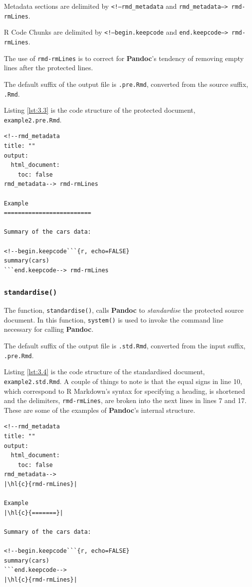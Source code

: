 \documentclass[a4paper, 12pt]{report}
\begin{document}
Metadata sections are delimited by \texttt{<!--rmd\_metadata} and \texttt{rmd\_metadata--> rmd-rmLines}.

R Code Chunks are delimited by \texttt{<!--begin.keepcode} and \texttt{end.keepcode--> rmd-rmLines}.

The use of \texttt{rmd-rmLines} is to correct for \textbf{Pandoc}'s tendency of removing empty lines after the protected lines.

The default suffix of the output file is \texttt{.pre.Rmd}, converted from the source suffix, \texttt{.Rmd}.

Listing \ref{lst:3.3} is the code structure of the protected document, \texttt{example2.pre.Rmd}.
\begin{lstlisting}[caption={\texttt{example2.pre.Rmd}}, label={lst:3.3}]
<!--rmd_metadata
title: ""
output:
  html_document:
    toc: false
rmd_metadata--> rmd-rmLines

Example
=========================

Summary of the cars data:

<!--begin.keepcode```{r, echo=FALSE}
summary(cars)
```end.keepcode--> rmd-rmLines
\end{lstlisting}


\subsubsection*{\texttt{standardise()}}
The function, \texttt{standardise()}, calls \textbf{Pandoc} to \emph{standardise} the protected source document. In this function, \texttt{system()} is used to invoke the command line necessary for calling \textbf{Pandoc}.

The default suffix of the output file is \texttt{.std.Rmd}, converted from the input suffix, \texttt{.pre.Rmd}.

Listing \ref{lst:3.4} is the code structure of the standardised document, \texttt{example2.std.Rmd}. A couple of things to note is that the equal signs in line 10, which correspond to R Markdown's syntax for specifying a heading, is shortened and the delimiters, \texttt{rmd-rmLines}, are broken into the next lines in lines 7 and 17. These are some of the examples of \textbf{Pandoc}'s internal structure.
\begin{lstlisting}[caption={\texttt{example2.std.Rmd}}, escapechar=\|, label={lst:3.4}]
<!--rmd_metadata
title: ""
output:
  html_document:
    toc: false
rmd_metadata-->
|\hl{c}{rmd-rmLines}|

Example
|\hl{c}{=======}|

Summary of the cars data:

<!--begin.keepcode```{r, echo=FALSE}
summary(cars)
```end.keepcode-->
|\hl{c}{rmd-rmLines}|
\end{lstlisting}
\end{document}

